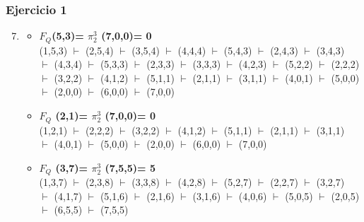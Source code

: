 \documentclass[xcolor=table]{beamer}
\begin{document}
\begin{frame}  \frametitle{Ejercicio 1}

\begin{enumerate}
\setcounter{enumi}{6}
    \item 
    
    
    \begin{itemize}
    \item \textbf{$F_Q$(5,3)= $\pi^3_2$ (7,0,0)= 0} \\
    (1,5,3) $\vdash$ (2,5,4) $\vdash$ (3,5,4) $\vdash$ (4,4,4) $\vdash$ (5,4,3) $\vdash$ (2,4,3) $\vdash$ (3,4,3) \\
    $\vdash$ (4,3,4) $\vdash$ (5,3,3) $\vdash$ (2,3,3) $\vdash$ (3,3,3) $\vdash$ (4,2,3) $\vdash$ (5,2,2) $\vdash$ (2,2,2) \\
    $\vdash$ (3,2,2) $\vdash$ (4,1,2) $\vdash$ (5,1,1) $\vdash$ (2,1,1) $\vdash$ (3,1,1) $\vdash$ (4,0,1) $\vdash$ (5,0,0) \\
    $\vdash$ (2,0,0) $\vdash$ (6,0,0) $\vdash$ (7,0,0)

    \item \textbf{$F_Q$ (2,1)= $\pi^3_2$ (7,0,0)= 0} \\
    (1,2,1) $\vdash$ (2,2,2) $\vdash$ (3,2,2) $\vdash$ (4,1,2) $\vdash$ (5,1,1) $\vdash$ (2,1,1) $\vdash$ (3,1,1) \\
    $\vdash$ (4,0,1) $\vdash$ (5,0,0) $\vdash$ (2,0,0) $\vdash$ (6,0,0) $\vdash$ (7,0,0) 

    \item \textbf{$F_Q$ (3,7)= $\pi^3_2$ (7,5,5)= 5} \\
    (1,3,7) $\vdash$ (2,3,8) $\vdash$ (3,3,8) $\vdash$ (4,2,8) $\vdash$ (5,2,7) $\vdash$ (2,2,7) $\vdash$ (3,2,7)  \\ 
    $\vdash$ (4,1,7) $\vdash$ (5,1,6) $\vdash$ (2,1,6) $\vdash$ (3,1,6) $\vdash$ (4,0,6) $\vdash$ (5,0,5) $\vdash$ (2,0,5) \\ 
    $\vdash$ (6,5,5) $\vdash$ (7,5,5)

    \end{itemize}
 





\end{enumerate}

\end{frame} 
\end{document}
